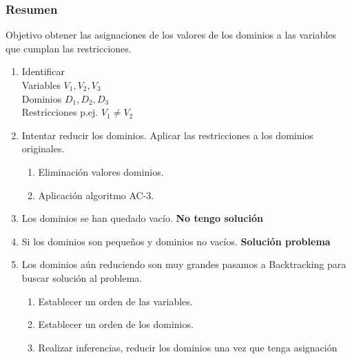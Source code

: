 \documentclass[xcolor=table]{beamer}
\begin{document}
\begin{frame}  \frametitle{Resumen} \scriptsize

Objetivo obtener las asignaciones de los valores de los dominios a las variables que cumplan las restricciones. 


\begin{enumerate}
\item  Identificar \\
Variables 			$V_1, V_2, V_3$\\
Dominios 		$D_1, D_2, D_3$\\
Restricciones	p.ej.  $V_1 \neq V_2$\\

\item  Intentar reducir los dominios. Aplicar las restricciones a los dominios originales.
\begin{enumerate} \scriptsize
\item Eliminación valores dominios.
\item  Aplicación algoritmo AC-3. 
\end{enumerate}

\item  Los dominios se han quedado vacío.  \textbf{No tengo solución } 
\item  Si los dominios son pequeños y dominios no vacíos.  \textbf{Solución problema}

\item Los dominios aún reduciendo son muy grandes pasamos a Backtracking para buscar solución al problema. 
\begin{enumerate} \scriptsize
\item 	Establecer un orden de las variables.
\item 	Establecer un orden de los dominios.
\item 	 Realizar inferencias, reducir los dominios una vez que tenga asignación
\end{enumerate}

\end{enumerate}



\end{frame} 
%
%
%
\end{document}
